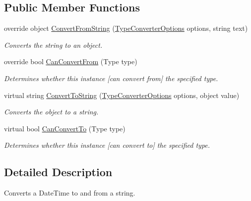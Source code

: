 \subsection*{Public Member Functions}
\begin{DoxyCompactItemize}
\item 
override object \hyperlink{a00062_a6b1b54cb2d1b200beb8fa3c63e4c064a}{Convert\-From\-String} (\hyperlink{a00152}{Type\-Converter\-Options} options, string text)
\begin{DoxyCompactList}\small\item\em Converts the string to an object. \end{DoxyCompactList}\item 
override bool \hyperlink{a00062_af44239d3bd014b1423fa80f7440bbd25}{Can\-Convert\-From} (Type type)
\begin{DoxyCompactList}\small\item\em Determines whether this instance \mbox{[}can convert from\mbox{]} the specified type. \end{DoxyCompactList}\item 
virtual string \hyperlink{a00066_a36cb2f9b24f15a671293f3a722324c27}{Convert\-To\-String} (\hyperlink{a00152}{Type\-Converter\-Options} options, object value)
\begin{DoxyCompactList}\small\item\em Converts the object to a string. \end{DoxyCompactList}\item 
virtual bool \hyperlink{a00066_acb65bd8c8199d88d5b1629ae35d18514}{Can\-Convert\-To} (Type type)
\begin{DoxyCompactList}\small\item\em Determines whether this instance \mbox{[}can convert to\mbox{]} the specified type. \end{DoxyCompactList}\end{DoxyCompactItemize}


\subsection{Detailed Description}
Converts a Date\-Time to and from a string. 



